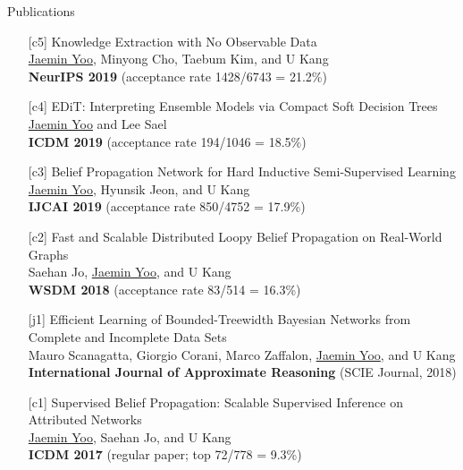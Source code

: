 \documentclass{resume} %
\begin{document}
\begin{rSection}{Publications}
\begin{enumerate}[leftmargin=*]
	\item[{[c5]}]
		Knowledge Extraction with No Observable Data \\
		\underline{Jaemin Yoo}, Minyong Cho, Taebum Kim, and U Kang \\
		\textbf{NeurIPS 2019} (acceptance rate 1428/6743 = 21.2\%)

	\item[{[c4]}]
		EDiT: Interpreting Ensemble Models via Compact Soft Decision Trees \\
		\underline{Jaemin Yoo} and Lee Sael \\
		\textbf{ICDM 2019} (acceptance rate 194/1046 = 18.5\%)

	\item[{[c3]}]
		Belief Propagation Network for Hard Inductive Semi-Supervised Learning \\
		\underline{Jaemin Yoo}, Hyunsik Jeon, and U Kang \\
		\textbf{IJCAI 2019} (acceptance rate 850/4752 = 17.9\%)

	\item[{[c2]}]
		Fast and Scalable Distributed Loopy Belief Propagation on Real-World Graphs \\
		Saehan Jo, \underline{Jaemin Yoo}, and U Kang \\
		\textbf{WSDM 2018} (acceptance rate 83/514 = 16.3\%)

	\item[{[j1]}]
		Efficient Learning of Bounded-Treewidth Bayesian Networks from Complete and Incomplete Data Sets \\
		Mauro Scanagatta, Giorgio Corani, Marco Zaffalon, \underline{Jaemin Yoo}, and U Kang \\
		\textbf{International Journal of Approximate Reasoning} (SCIE Journal, 2018)

	\item[{[c1]}]
		Supervised Belief Propagation: Scalable Supervised Inference on Attributed Networks \\
		\underline{Jaemin Yoo}, Saehan Jo, and U Kang \\
		\textbf{ICDM 2017} (regular paper; top 72/778 = 9.3\%)

\end{enumerate}
\end{rSection}

\end{document}
